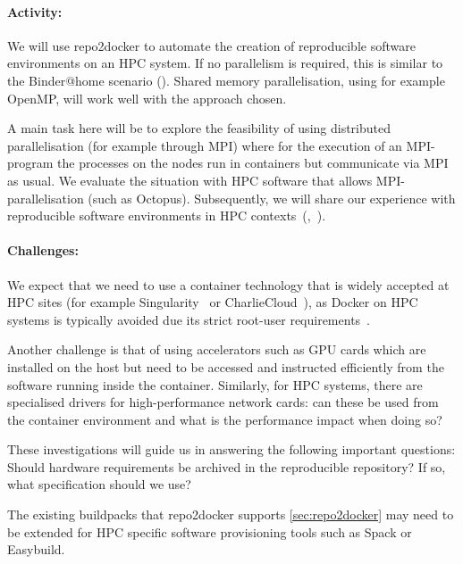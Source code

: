 \begin{task}
\paragraph*{Activity:} We will use repo2docker to automate the creation of
reproducible software environments on an HPC system. If no parallelism is
required, this is similar to the Binder@home scenario
(). Shared memory parallelisation, using for
example OpenMP, will work well with the approach chosen.

A main task here will be to explore the feasibility of using distributed
parallelisation (for example through MPI) where for the execution of an
MPI-program the processes on the nodes run in containers but communicate via MPI
as usual. We evaluate the situation with HPC software that allows
MPI-parallelisation (such as Octopus). Subsequently, we will share our experience with
reproducible software environments in HPC
contexts~(,~).

\paragraph*{Challenges:} We expect that we need to use a container technology
that is widely accepted at HPC sites (for example Singularity~\cite{Singularity2017} or CharlieCloud~\cite{CharlieCloud2017}), as Docker
on HPC systems is typically avoided due its strict root-user requirements~\cite{Gerhardt_2017}.

Another challenge is that of using accelerators such as GPU cards which are
installed on the host but need to be accessed and instructed efficiently from the software running
inside the container.
Similarly, for HPC systems, there are specialised drivers for high-performance
network cards: can these be used from the container environment and what
is the performance impact when doing so?  \cite{Liu2021}

These investigations will guide us in answering the following important questions:
Should hardware requirements be archived in the reproducible repository?
If so, what specification should we use?

The existing buildpacks that repo2docker supports
\ref{sec:repo2docker} may need to be extended for
HPC specific software provisioning tools such as Spack or Easybuild.


\end{task}





